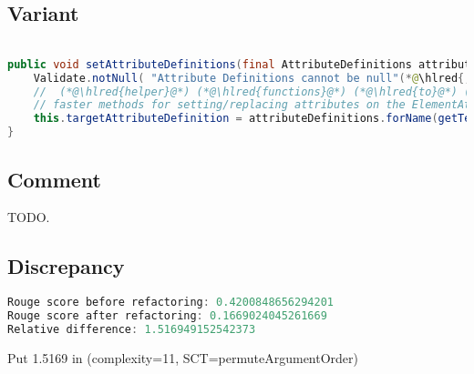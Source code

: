 \documentclass[11pt]{article}
\DeclareRobustCommand{\hlred}[1]{{\sethlcolor{YellowOrange}\hl{#1}}}
\begin{document}
  \subsection{Variant}

  \begin{lstlisting}[language=java]

public void setAttributeDefinitions(final AttributeDefinitions attributeDefinitions) {
    Validate.notNull( "Attribute Definitions cannot be null"(*@\hlred{,attributeDefinitions}@*));
    //  (*@\hlred{helper}@*) (*@\hlred{functions}@*) (*@\hlred{to}@*) (*@\hlred{implement}@*) (*@\hlred{more}@*) (*@\hlred{specific}@*) (*@\hlred{behavior}@*) (*@\hlred{and}@*) (*@\hlred{other}@*) (*@\hlred{general}@*) (*@\hlred{purpose}@*) (*@\hlred{behavior}@*) to (*@\hlred{call}@*) (*@\hlred{in this}@*)
    // faster methods for setting/replacing attributes on the ElementAttributes implementation
    this.targetAttributeDefinition = attributeDefinitions.forName(getTemplateMode(), this.targetAttrCompleteName);
}
  \end{lstlisting}

  \subsection{Comment}

  TODO.

  \subsection{Discrepancy}

  \begin{lstlisting}[language=java]
Rouge score before refactoring: 0.4200848656294201
Rouge score after refactoring: 0.1669024045261669
Relative difference: 1.516949152542373
  \end{lstlisting}

  Put 1.5169 in (complexity=11, SCT=permuteArgumentOrder)
\end{document}
